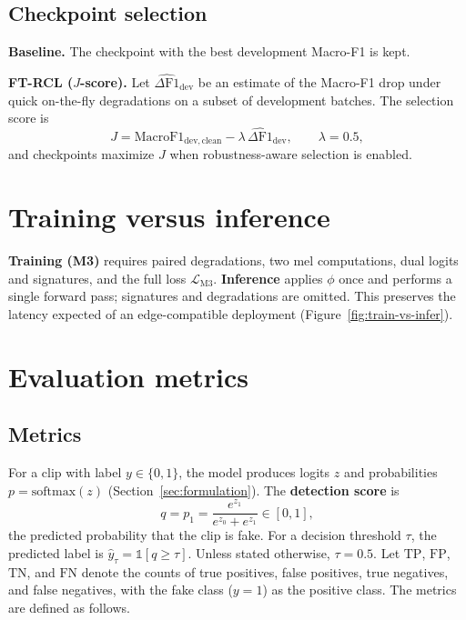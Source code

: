 \subsection{Checkpoint selection}

\textbf{Baseline.} The checkpoint with the best development Macro-F1 is kept.

\textbf{FT-RCL ($J$-score).} Let $\widehat{\Delta \mathrm{F1}}_{\mathrm{dev}}$ be an estimate of the Macro-F1 drop under quick on-the-fly degradations on a subset of development batches. The selection score is
\begin{equation}
J = \mathrm{MacroF1}_{\mathrm{dev,clean}} - \lambda\,\widehat{\Delta \mathrm{F1}}_{\mathrm{dev}}, \qquad \lambda = 0.5 ,
\label{eq:jscore}
\end{equation}
and checkpoints maximize $J$ when robustness-aware selection is enabled.

\section{Training versus inference}
\label{sec:train-infer}

\textbf{Training (M3)} requires paired degradations, two mel computations, dual logits and signatures, and the full loss $\mathcal{L}_{\mathrm{M3}}$. \textbf{Inference} applies $\phi$ once and performs a single forward pass; signatures and degradations are omitted. This preserves the latency expected of an edge-compatible deployment (Figure~\ref{fig:train-vs-infer}).



\section{Evaluation metrics}
\label{sec:evaluation-metrics}

\subsection{Metrics}

For a clip with label $y \in \{0,1\}$, the model produces logits $z$ and probabilities $p = \mathrm{softmax}(z)$ (Section~\ref{sec:formulation}). The \textbf{detection score} is
\begin{equation}
q = p_1 = \frac{e^{z_1}}{e^{z_0} + e^{z_1}} \in [0,1],
\label{eq:q}
\end{equation}
the predicted probability that the clip is fake. For a decision threshold $\tau$, the predicted label is $\hat{y}_\tau = \mathbb{1}[q \ge \tau]$. Unless stated otherwise, $\tau = 0.5$. Let $\mathrm{TP}$, $\mathrm{FP}$, $\mathrm{TN}$, and $\mathrm{FN}$ denote the counts of true positives, false positives, true negatives, and false negatives, with the fake class ($y=1$) as the positive class. The metrics are defined as follows.

